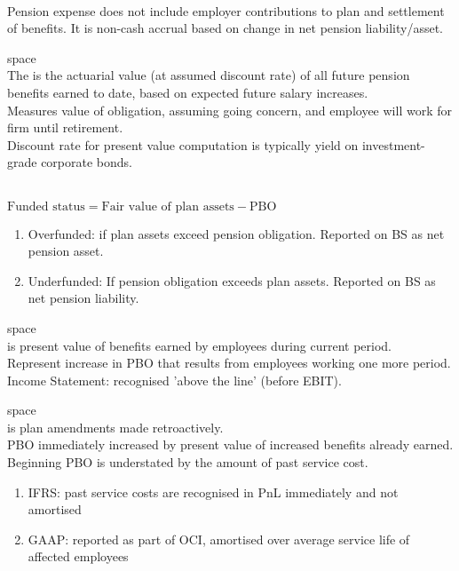 \begin{remark} \\
Pension expense does not include employer contributions to plan and settlement of benefits. It is non-cash accrual based on change in net pension liability/asset. 
\end{remark}

\begin{definition} {\color{white}space}\\
The  is the actuarial value (at assumed discount rate) of all future pension benefits earned to date, based on expected future salary increases.\\
Measures value of obligation, assuming going concern, and employee will work for firm until retirement.\\
Discount rate for present value computation is typically yield on investment-grade corporate bonds.
\end{definition}

\begin{definition} \\
$\text{Funded status} = \text{Fair value of plan assets} - \text{PBO}$
\begin{enumerate}[label=\roman*.]
\setlength{\itemsep}{0pt}
\item Overfunded: if plan assets exceed pension obligation. Reported on BS as net pension asset.
\item Underfunded: If pension obligation exceeds plan assets. Reported on BS as net pension liability.
\end{enumerate}
\end{definition}

\begin{definition} {\color{white}space}\\
 is present value of benefits earned by employees during current period.\\
Represent increase in PBO that results from employees working one more period.\\
Income Statement: recognised 'above the line' (before EBIT).
\end{definition}

\begin{definition} {\color{white}space}\\
 is plan amendments made retroactively.\\
PBO immediately increased by present value of increased benefits already earned. Beginning PBO is understated by the amount of past service cost.
\begin{enumerate}[label=\roman*.]
\setlength{\itemsep}{0pt}
\item IFRS: past service costs are recognised in PnL immediately and not amortised
\item GAAP: reported as part of OCI, amortised over average service life of affected employees
\end{enumerate}
\end{definition}


